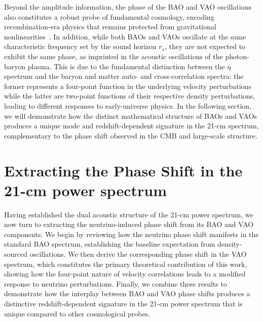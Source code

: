 \documentclass[floats,floatfix,showpacs,amssymb,prd,twocolumn,superscriptaddress,nofootinbib,reprint,preprintnumbers]{revtex4-2}
\begin{document}
Beyond the amplitude information, the phase of the BAO and VAO oscillations also constitutes a robust probe of fundamental cosmology, encoding recombination-era physics that remains protected from gravitational nonlinearities~\cite{Pan:2016zla,Baumann:2017lmt,Green:2020fjb}. In addition, while both BAOs and VAOs oscillate at the same characteristic frequency set by the sound horizon $r_s$, they are not expected to exhibit the same phase, as imprinted in the acoustic oscillations of the photon-baryon plasma. This is due to the fundamental distinction between the $\eta$ spectrum and the baryon and matter auto- and cross-correlation spectra: the former represents a four-point function in the underlying velocity perturbations while the latter are two-point functions of their respective density perturbations, leading to different responses to early-universe physics. In the following section, we will demonstrate how the distinct mathematical structure of BAOs and VAOs produces a unique mode and redshift-dependent signature in the 21-cm spectrum, complementary to the phase shift observed in the CMB and large-scale structure.



\section{Extracting the Phase Shift in the 21-cm power spectrum}\label{sec:phase_21cm}


Having established the dual acoustic structure of the 21-cm power spectrum, we now turn to extracting the neutrino-induced phase shift from its BAO and VAO components. We begin by reviewing how the neutrino phase shift manifests in the standard BAO spectrum, establishing the baseline expectation from density-sourced oscillations. We then derive the corresponding phase shift in the VAO spectrum, which constitutes the primary theoretical contribution of this work, showing how the four-point nature of velocity correlations leads to a modified response to neutrino perturbations. Finally, we combine these results to demonstrate how the interplay between BAO and VAO phase shifts produces a distinctive redshift-dependent signature in the 21-cm power spectrum that is unique compared to other cosmological probes.
\end{document}
